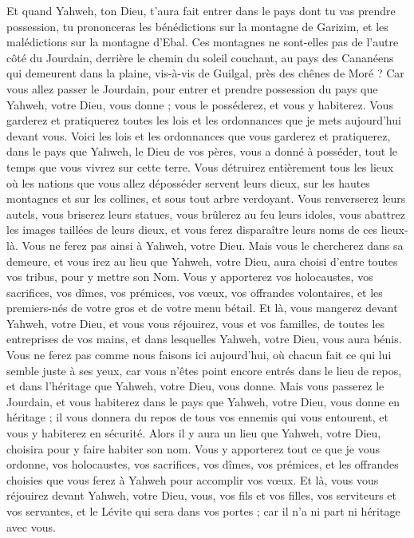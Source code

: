 \begin{multicols}{2}
Et quand Yahweh, ton Dieu, t'aura fait entrer dans le pays dont tu vas prendre possession, tu prononceras les bénédictions sur la montagne de Garizim, et les malédictions sur la montagne d’Ebal.
Ces montagnes ne sont-elles pas de l’autre côté du Jourdain, derrière le chemin du soleil couchant, au pays des Cananéens qui demeurent dans la plaine, vis-à-vis de Guilgal, près des chênes de Moré ?
Car vous allez passer le Jourdain, pour entrer et prendre possession du pays que Yahweh, votre Dieu, vous donne ; vous le posséderez, et vous y habiterez.
Vous garderez et pratiquerez toutes les lois et les ordonnances que je mets aujourd'hui devant vous.
\VerseOne{}Voici les lois et les ordonnances que vous garderez et pratiquerez, dans le pays que Yahweh, le Dieu de vos pères, vous a donné à posséder, tout le temps que vous vivrez sur cette terre.
Vous détruirez entièrement tous les lieux où les nations que vous allez déposséder servent leurs dieux, sur les hautes montagnes et sur les collines, et sous tout arbre verdoyant.
Vous renverserez leurs autels, vous briserez leurs statues, vous brûlerez au feu leurs idoles\FTNT{}, vous abattrez les images taillées de leurs dieux, et vous ferez disparaître leurs noms de ces lieux-là.
Vous ne ferez pas ainsi à Yahweh, votre Dieu.
Mais vous le chercherez dans sa demeure, et vous irez au lieu que Yahweh, votre Dieu, aura choisi d'entre toutes vos tribus, pour y mettre son Nom.
Vous y apporterez vos holocaustes, vos sacrifices, vos dîmes, vos prémices, vos vœux, vos offrandes volontaires, et les premiers-nés de votre gros et de votre menu bétail.
Et là, vous mangerez devant Yahweh, votre Dieu, et vous vous réjouirez, vous et vos familles, de toutes les entreprises de vos mains, et dans lesquelles Yahweh, votre Dieu, vous aura bénis.
Vous ne ferez pas comme nous faisons ici aujourd'hui, où chacun fait ce qui lui semble juste à ses yeux,
car vous n'êtes point encore entrés dans le lieu de repos, et dans l'héritage que Yahweh, votre Dieu, vous donne.
Mais vous passerez le Jourdain, et vous habiterez dans le pays que Yahweh, votre Dieu, vous donne en héritage ; il vous donnera du repos de tous vos ennemis qui vous entourent, et vous y habiterez en sécurité.
Alors il y aura un lieu que Yahweh, votre Dieu, choisira pour y faire habiter son nom. Vous y apporterez tout ce que je vous ordonne, vos holocaustes, vos sacrifices, vos dîmes, vos prémices, et les offrandes choisies que vous ferez à Yahweh pour accomplir vos vœux.
Et là, vous vous réjouirez devant Yahweh, votre Dieu, vous, vos fils et vos filles, vos serviteurs et vos servantes, et le Lévite qui sera dans vos portes ; car il n'a ni part ni héritage avec vous.

\end{multicols}
